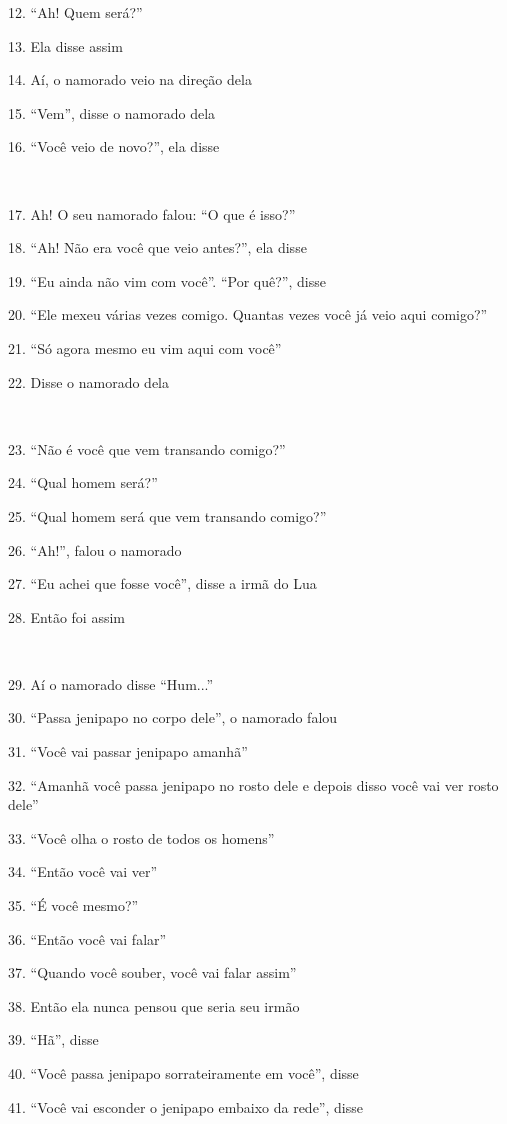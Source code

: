 12. ``Ah! Quem será?''

13. Ela disse assim

14. Aí, o namorado veio na direção dela

15. ``Vem'', disse o namorado dela

16. ``Você veio de novo?'', ela disse

~

17. Ah! O seu namorado falou: ``O que é isso?''

18. ``Ah! Não era você que veio antes?'', ela disse

19. ``Eu ainda não vim com você''. ``Por quê?'', disse

20. ``Ele mexeu várias vezes comigo. Quantas vezes você já veio aqui comigo?''

21. ``Só agora mesmo eu vim aqui com você''

22. Disse o namorado dela

~

23. ``Não é você que vem transando comigo?''

24. ``Qual homem será?''

25. ``Qual homem será que vem transando comigo?''

26. ``Ah!'', falou o namorado

27. ``Eu achei que fosse você'', disse a irmã do Lua

28. Então foi assim

~

29. Aí o namorado disse ``Hum...''

30. ``Passa jenipapo no corpo dele'', o namorado falou

31. ``Você vai passar jenipapo amanhã''

32. ``Amanhã você passa jenipapo no rosto dele e depois disso você vai
ver rosto dele''

33. ``Você olha o rosto de todos os homens''

34. ``Então você vai ver''

35. ``É você mesmo?''

36. ``Então você vai falar''

37. ``Quando você souber, você vai falar assim''

38. Então ela nunca pensou que seria seu irmão

39. ``Hã'', disse

40. ``Você passa jenipapo sorrateiramente em você'', disse

41. ``Você vai esconder o jenipapo embaixo da rede'', disse

